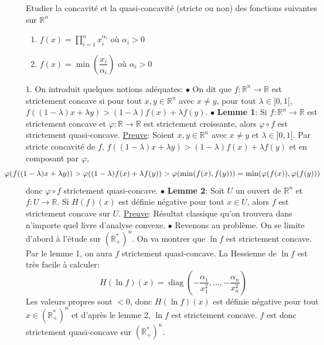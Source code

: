 \documentclass{fancybook}
\DeclareMathOperator{\diag}{diag}
\begin{document}
\begin{exercice}
Etudier la concavité et la quasi-concavité (stricte ou non) des fonctions suivantes sur $\mathbb R^n$
\begin{enumerate}
\item $f(x)=\prod_{i=1}^n x_i^{\alpha_i}$ où $\alpha_i>0$
\item $f(x)=\min(\dfrac{x_i}{\alpha_i })$ où $\alpha_i>0$
\end{enumerate}
\end{exercice}
1. On introduit quelques notions adéquates:\newline
$\bullet$ On dit que $f:\mathbb R^n\to \mathbb R$ est strictement concave si pour tout $x,y\in \mathbb R^n$ avec $x\neq y$, pour tout $\lambda\in ]0,1[$, $f((1-\lambda)x+\lambda y) > (1-\lambda)f(x) + \lambda f(y)$.\newline
$\bullet$ \textbf{Lemme 1}: Si $f:\mathbb R^n\to \mathbb R$ est strictement concave et $\varphi: \mathbb R \to \mathbb R$ est strictement croissante, alors $\varphi \circ f$ est strictement quasi-concave.\newline
\underline{Preuve}: Soient $x,y\in \mathbb R^n$ avec $x\neq y$ et $\lambda\in ]0,1[$. Par stricte concavité de $f$, $f((1-\lambda)x+\lambda y) > (1-\lambda)f(x) + \lambda f(y)$ et en composant par $\varphi$, 
$$\hspace*{-1cm}\varphi(f((1-\lambda)x+\lambda y)) > \varphi((1-\lambda)f(x) + \lambda f(y)) > \varphi(\min(f(x),f(y)))=\min(\varphi(f(x)),\varphi(f(y)))$$
donc $\varphi \circ f$ strictement quasi-concave.\newline
$\bullet$ \textbf{Lemme 2}: Soit $U$ un ouvert de $\mathbb R^n$ et $f:U\to \mathbb R$. Si $H(f)(x)$ est définie négative pour tout $x\in U$, alors $f$ est strictement concave sur $U$.\newline
\underline{Preuve}: Résultat classique qu'on trouvera dans n'importe quel livre d'analyse convexe.
\newline \newline
$\bullet$ Revenons au problème. On se limite d'abord à l'étude sur $(\mathbb R_+^*)^n$. \newline
On va montrer que $\ln f$ est strictement concave. Par le lemme 1, on aura $f$ strictement quasi-concave.
La Hessienne de $\ln f$ est très facile à calculer: $$H(\ln f)(x)=\diag(-\dfrac{\alpha_1}{x_1^2},\ldots, -\dfrac{\alpha_n}{x_n^2})$$
Les valeurs propres sont $<0$, donc $H(\ln f)(x)$ est définie négative pour tout $x\in(\mathbb R_+^*)^n $ et d'après le lemme 2, $\ln f$ est strictement concave. $f$ est donc strictement quasi-concave sur $(\mathbb R_+^*)^n$.\newline
\end{document}
